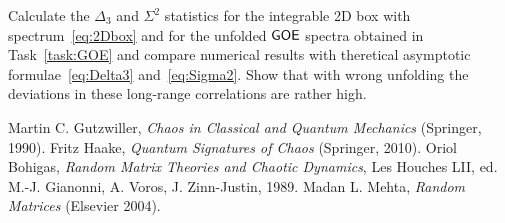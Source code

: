 \documentclass[a4paper,11pt,twoside]{article}
\begin{document}
    \begin{task}
        Calculate the $\Delta_{3}$ and $\Sigma^{2}$ statistics for the integrable 2D box with spectrum~\eqref{eq:2Dbox} and for the unfolded $\mathsf{GOE}$ spectra obtained in Task~\ref{task:GOE} and compare numerical results with theretical asymptotic formulae~\eqref{eq:Delta3} and~\eqref{eq:Sigma2}.
        Show that with wrong unfolding the deviations in these long-range correlations are rather high.
    \end{task}

\begin{thebibliography}{99}
     Martin C. Gutzwiller, {\it Chaos in Classical and Quantum Mechanics} (Springer, 1990).
     Fritz Haake, {\it Quantum Signatures of Chaos} (Springer, 2010).
     Oriol Bohigas, {\it Random Matrix Theories and Chaotic Dynamics}, Les Houches LII, ed. M.-J. Gianonni, A. Voros, J. Zinn-Justin, 1989.
     Madan L. Mehta, {\it Random Matrices} (Elsevier 2004).


\end{thebibliography}
\end{document}
